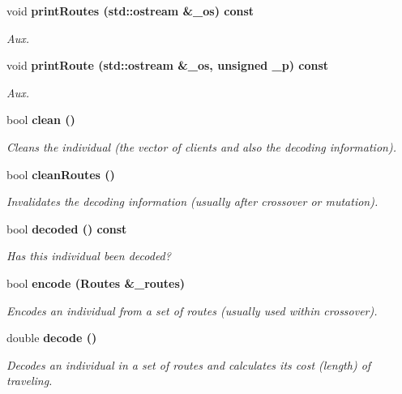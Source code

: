 \begin{CompactItemize}
void \bf{print\-Routes} (std::ostream \&\_\-os) const 
\begin{CompactList}\small\item\em Aux. \item\end{CompactList}\item 
void \bf{print\-Route} (std::ostream \&\_\-os, unsigned \_\-p) const 
\begin{CompactList}\small\item\em Aux. \item\end{CompactList}\item 
bool \bf{clean} ()
\begin{CompactList}\small\item\em Cleans the individual (the vector of clients and also the decoding information). \item\end{CompactList}\item 
bool \bf{clean\-Routes} ()
\begin{CompactList}\small\item\em Invalidates the decoding information (usually after crossover or mutation). \item\end{CompactList}\item 
bool \bf{decoded} () const 
\begin{CompactList}\small\item\em Has this individual been decoded? \item\end{CompactList}\item 
bool \bf{encode} (Routes \&\_\-routes)
\begin{CompactList}\small\item\em Encodes an individual from a set of routes (usually used within crossover). \item\end{CompactList}\item 
double \bf{decode} ()
\begin{CompactList}\small\item\em Decodes an individual in a set of routes and calculates its cost (length) of traveling. \item\end{CompactList}\end{CompactItemize}
